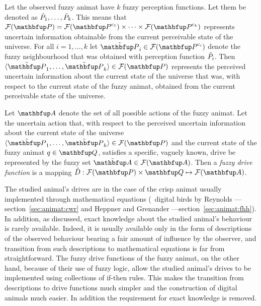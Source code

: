 Let the observed fuzzy animat have $k$ fuzzy perception functions. Let them be denoted as ${\tilde{P}}_1,\ldots,{\tilde{P}}_k$. This means that $\fpowset{\set{P}}=\fpowset{\set{P}^{\mathrm{c}_1}} \times \cdots \times \fpowset{\set{P}^{\mathrm{c}_k}}$ represents uncertain information obtainable from the current perceivable state of the universe. For all $i=1,\ldots,k$ let $\fset{P}_i \in \fpowset{\set{P}^{\mathrm{c}_i}}$ denote the fuzzy neighbourhood that was obtained with perception function ${\tilde{P}}_i$. Then $\langle \fset{P}_1,\ldots,\fset{P}_k \rangle \in \fpowset{\set{P}}$ represents the perceived uncertain information about the current state of the universe that was, with respect to the current state of the fuzzy animat, obtained from the current perceivable state of the universe.

\begin{definition}
\label{def:fuzzyAnimat:Dj}
Let $\set{A}$ denote the set of all possible actions of the fuzzy animat. Let the uncertain action that, with respect to the perceived uncertain information about the current state of the universe $\langle \fset{P}_1,\ldots,\fset{P}_k \rangle \in \fpowset{\set{P}}$ and the current state of the fuzzy animat $q \in \set{Q}$, satisfies a specific, vaguely known, drive be represented by the fuzzy set $\fset{A} \in \fpowset{\set{A}}$. Then a \emph{fuzzy drive function} is a mapping $\ffunc{D}: \fpowset{\set{P}} \times \set{Q} \mapsto \fpowset{\set{A}}$.
\end{definition}

The studied animal's drives are in the case of the crisp animat  usually implemented through mathematical equations (\eg\ digital birds by Reynolds \cite{reynolds:1987,reynolds:1999}---section~\ref{sec:animat:cwr} and Heppner and Grenander \cite{heppner:1990}---section~\ref{sec:animat:fhh}). In addition, as discussed, exact knowledge about the studied animal's behaviour is rarely available. Indeed, it is usually available only in the form of descriptions of the observed behaviour bearing a fair amount of influence by the observer, and transition from such descriptions to mathematical equations is far from straightforward. The fuzzy drive functions of the fuzzy animat, on the other hand, because of their use of fuzzy logic, allow the studied animal's drives to be implemented using collections of if-then rules. This makes the transition from descriptions to drive functions much simpler and the construction of digital animals much easier. In addition the requirement for exact knowledge is removed.
 
